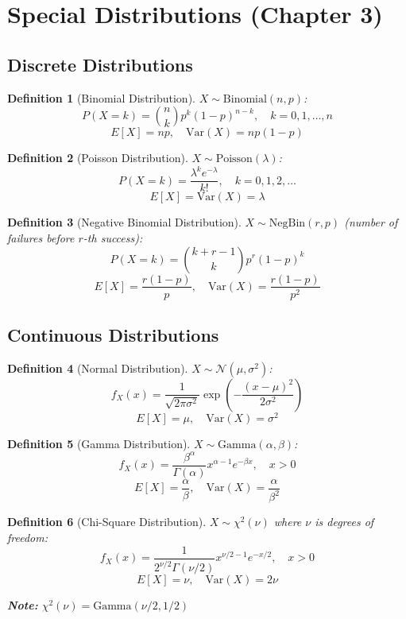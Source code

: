 \documentclass[12pt,a4paper]{amsart}
\newtheorem{definition}{Definition}[section]
\theoremstyle{remark}
\begin{document}
\section{Special Distributions (Chapter 3)}

\subsection{Discrete Distributions}

\begin{definition}[Binomial Distribution]
$X \sim \text{Binomial}(n,p)$:
$$P(X = k) = \binom{n}{k} p^k (1-p)^{n-k}, \quad k = 0,1,\ldots,n$$
$$E[X] = np, \quad \text{Var}(X) = np(1-p)$$
\end{definition}

\begin{definition}[Poisson Distribution]
$X \sim \text{Poisson}(\lambda)$:
$$P(X = k) = \frac{\lambda^k e^{-\lambda}}{k!}, \quad k = 0,1,2,\ldots$$
$$E[X] = \text{Var}(X) = \lambda$$
\end{definition}

\begin{definition}[Negative Binomial Distribution]
$X \sim \text{NegBin}(r,p)$ (number of failures before $r$-th success):
$$P(X = k) = \binom{k+r-1}{k} p^r (1-p)^k$$
$$E[X] = \frac{r(1-p)}{p}, \quad \text{Var}(X) = \frac{r(1-p)}{p^2}$$
\end{definition}

\subsection{Continuous Distributions}

\begin{definition}[Normal Distribution]
$X \sim \mathcal{N}(\mu, \sigma^2)$:
$$f_X(x) = \frac{1}{\sqrt{2\pi\sigma^2}} \exp\left(-\frac{(x-\mu)^2}{2\sigma^2}\right)$$
$$E[X] = \mu, \quad \text{Var}(X) = \sigma^2$$
\end{definition}

\begin{definition}[Gamma Distribution]
$X \sim \text{Gamma}(\alpha, \beta)$:
$$f_X(x) = \frac{\beta^\alpha}{\Gamma(\alpha)} x^{\alpha-1} e^{-\beta x}, \quad x > 0$$
$$E[X] = \frac{\alpha}{\beta}, \quad \text{Var}(X) = \frac{\alpha}{\beta^2}$$
\end{definition}

\begin{definition}[Chi-Square Distribution]
$X \sim \chi^2(\nu)$ where $\nu$ is degrees of freedom:
$$f_X(x) = \frac{1}{2^{\nu/2}\Gamma(\nu/2)} x^{\nu/2-1} e^{-x/2}, \quad x > 0$$
$$E[X] = \nu, \quad \text{Var}(X) = 2\nu$$

\textbf{Note:} $\chi^2(\nu) = \text{Gamma}(\nu/2, 1/2)$
\end{definition}
\end{document}
